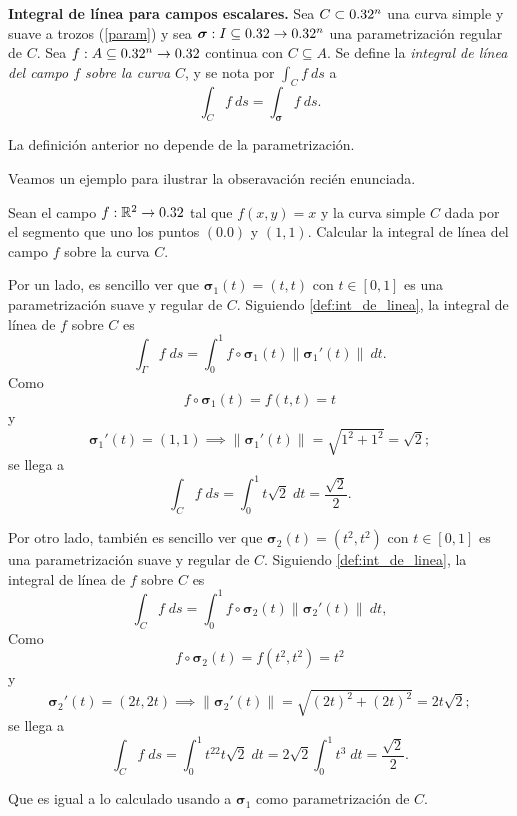 \begin{definition}\label{def:int_de_linea}\textbf{Integral de l\'inea para campos escalares.}
    Sea $C\subset 0.32^n$  una curva simple y suave a trozos  (\ref{param})  y sea $\boldsymbol{\sigma}:I\subseteq0.32\to0.32^n$ una parametrizaci\'on regular de $C$.   Sea $f:A\subseteq0.32^n\to0.32$ continua con $C  \subseteq  A$.   Se define la \emph{integral de l\'inea del campo $f$ sobre la curva} $C$, y se nota por $\int_{C}f\:ds$ a
    \[
        \int_{C}f\:ds= \int_{\boldsymbol{\sigma}}f\:ds. 
    \]
   


\end{definition}

\begin{obs} La definici\'on anterior no depende de la parametrizaci\'on.
\end{obs} 

  Veamos un ejemplo para ilustrar la obseravaci\'on  reci\'en enunciada.  

\begin{example}  Sean el campo $f: \mathbb{R}^{2}\to0.32$ tal que $f(x,y)=x$ y la curva simple $C$  dada por el segmento que uno los puntos $(0.0)$ y $(1,1)$.  Calcular la integral de l\'inea del campo $f$ sobre la curva $C$.
   
   Por un lado,  es sencillo ver que    $\boldsymbol{\sigma}_1(t)=(t,t)$ con $t\in[0,1]$ es una parametrización suave y regular  de $C$.  Siguiendo  \ref{def:int_de_linea},  la integral de l\'inea de $f$ sobre $C$ es
    \[
        \int_\Gamma f\;ds=\int_0^1f\circ\boldsymbol{\sigma}_1(t)\|\boldsymbol{\sigma}_1'(t)\|\:dt.
    \]
    Como
    \[
        f\circ\boldsymbol{\sigma}_1(t)=f(t,t)=t 
    \]
    y
    \[
        \boldsymbol{\sigma}_1'(t)=(1,1)\implies\|\boldsymbol{\sigma}_1'(t)\|=\sqrt{1^2+1^2}=\sqrt{2};
    \]
    se llega a 
    \[
        \int_C f\;ds=\int_0^1t\sqrt{2}\;dt=\frac{\sqrt{2}}{2}.
    \]

    Por otro lado, tambi\'en es sencillo ver que  $\boldsymbol{\sigma}_2(t)=(t^2,t^2)$ con $t\in[0,1]$ es una parametrización  suave y regular  de $C$.  Siguiendo   \ref{def:int_de_linea},  la integral de l\'inea de $f$ sobre $C$ es
    \[
        \int_C f\;ds=\int_0^1f\circ\boldsymbol{\sigma}_2(t)\|\boldsymbol{\sigma}_2'(t)\|\:dt,
    \]
    Como 
    \[
        f\circ\boldsymbol{\sigma}_2(t)= f(t^{2},t^{2}) = t^2
    \]
    y
    \[
        \boldsymbol{\sigma}_2'(t)=(2t,2t)\implies\|\boldsymbol{\sigma}_2'(t)\|=\sqrt{(2t)^2+(2t)^2}=2t\sqrt{2};
    \]
     se llega a 
    \[
        \int_C f\;ds=\int_0^1t^22t\sqrt{2} \;dt =2\sqrt{2}\int_0^1t^3\;dt=\frac{\sqrt{2}}{2}.
    \]
    
    Que es igual a lo calculado usando a  $\boldsymbol{\sigma}_1$ como parametrizaci\'on de $C.$
  \end{example}  

